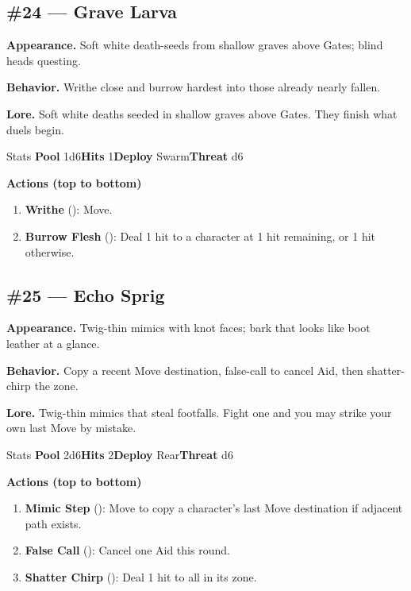 \subsection*{\#24 --- Grave Larva}

\textbf{Appearance.} Soft white death-seeds from shallow graves above Gates; blind heads questing.

\textbf{Behavior.} Writhe close and burrow hardest into those already nearly fallen.

\textbf{Lore.} Soft white deaths seeded in shallow graves above Gates. They finish what duels begin.

\begin{monsterentry}{Stats}
\textbf{Pool} 1d6\quad\textbf{Hits} 1\quad\textbf{Deploy} Swarm\quad\textbf{Threat} d6

\textbf{Actions (top to bottom)}
\begin{enumerate}\setlength{\itemsep}{0.15em}\setlength{\parskip}{0pt}
  \item \textbf{Writhe} (\easy): Move.
  \item \textbf{Burrow Flesh} (\medium): Deal 1 hit to a character at 1 hit remaining, or 1 hit otherwise.
\end{enumerate}
\end{monsterentry}

\subsection*{\#25 --- Echo Sprig}

\textbf{Appearance.} Twig-thin mimics with knot faces; bark that looks like boot leather at a glance.

\textbf{Behavior.} Copy a recent Move destination, false-call to cancel Aid, then shatter-chirp the zone.

\textbf{Lore.} Twig-thin mimics that steal footfalls. Fight one and you may strike your own last Move by mistake.

\begin{monsterentry}{Stats}
\textbf{Pool} 2d6\quad\textbf{Hits} 2\quad\textbf{Deploy} Rear\quad\textbf{Threat} d6

\textbf{Actions (top to bottom)}
\begin{enumerate}\setlength{\itemsep}{0.15em}\setlength{\parskip}{0pt}
  \item \textbf{Mimic Step} (\easy): Move to copy a character's last Move destination if adjacent path exists.
  \item \textbf{False Call} (\medium): Cancel one Aid this round.
  \item \textbf{Shatter Chirp} (\hard): Deal 1 hit to all in its zone.
\end{enumerate}
\end{monsterentry}

